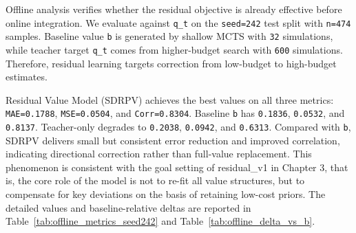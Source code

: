 
Offline analysis verifies whether the residual objective is already effective before online integration. We evaluate against \texttt{q_t} on the \texttt{seed=242} test split with \texttt{n=474} samples. Baseline value \texttt{b} is generated by shallow MCTS with \texttt{32} simulations, while teacher target \texttt{q_t} comes from higher-budget search with \texttt{600} simulations. Therefore, residual learning targets correction from low-budget to high-budget estimates.


Residual Value Model (SDRPV) achieves the best values on all three metrics: \texttt{MAE=0.1788}, \texttt{MSE=0.0504}, and \texttt{Corr=0.8304}. Baseline \texttt{b} has \texttt{0.1836}, \texttt{0.0532}, and \texttt{0.8137}. Teacher-only degrades to \texttt{0.2038}, \texttt{0.0942}, and \texttt{0.6313}. Compared with \texttt{b}, SDRPV delivers small but consistent error reduction and improved correlation, indicating directional correction rather than full-value replacement. This phenomenon is consistent with the goal setting of residual_v1 in Chapter 3, that is, the core role of the model is not to re-fit all value structures, but to compensate for key deviations on the basis of retaining low-cost priors.
The detailed values and baseline-relative deltas are reported in Table~\ref{tab:offline_metrics_seed242} and Table~\ref{tab:offline_delta_vs_b}.

